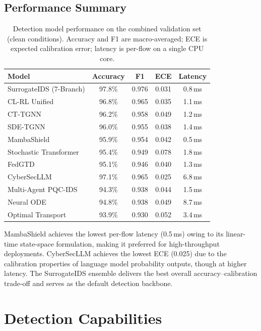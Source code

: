 \documentclass[11pt,a4paper]{article}
\begin{document}
\subsection{Performance Summary}
\begin{table}[H]
\centering
\caption{Detection model performance on the combined validation set (clean conditions). Accuracy and F1 are macro-averaged; ECE is expected calibration error; latency is per-flow on a single CPU core.}
\label{tab:model_performance}
\small
\begin{tabular}{@{}lcccc@{}}
\toprule
\textbf{Model} & \textbf{Accuracy} & \textbf{F1} & \textbf{ECE} & \textbf{Latency} \\
\midrule
SurrogateIDS (7-Branch)   & 97.8\% & 0.976 & 0.031 & 0.8\,ms \\
CL-RL Unified             & 96.8\% & 0.965 & 0.035 & 1.1\,ms \\
CT-TGNN                   & 96.2\% & 0.958 & 0.049 & 1.2\,ms \\
SDE-TGNN                  & 96.0\% & 0.955 & 0.038 & 1.4\,ms \\
MambaShield               & 95.9\% & 0.954 & 0.042 & 0.5\,ms \\
Stochastic Transformer    & 95.4\% & 0.949 & 0.078 & 1.8\,ms \\
FedGTD                    & 95.1\% & 0.946 & 0.040 & 1.3\,ms \\
CyberSecLLM               & 97.1\% & 0.965 & 0.025 & 6.8\,ms \\
Multi-Agent PQC-IDS       & 94.3\% & 0.938 & 0.044 & 1.5\,ms \\
Neural ODE                & 94.8\% & 0.938 & 0.049 & 8.7\,ms \\
Optimal Transport         & 93.9\% & 0.930 & 0.052 & 3.4\,ms \\
\bottomrule
\end{tabular}
\end{table}
MambaShield achieves the lowest per-flow latency (0.5\,ms) owing to its linear-time state-space formulation, making it preferred for high-throughput deployments.  CyberSecLLM achieves the lowest ECE (0.025) due to the calibration properties of language model probability outputs, though at higher latency.  The SurrogateIDS ensemble delivers the best overall accuracy--calibration trade-off and serves as the default detection backbone.
\section{Detection Capabilities}
\label{sec:detection}
\end{document}
